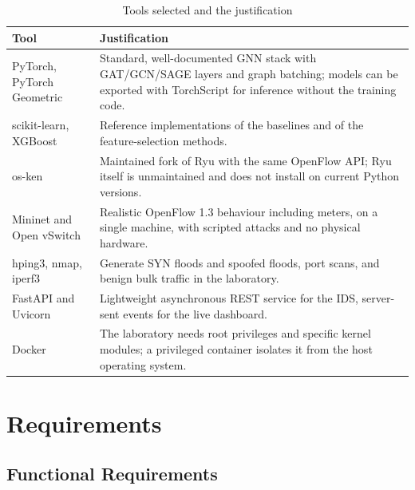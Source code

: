 \begin{table}[htbp]
\centering
\caption{Tools selected and the justification}
\label{tab:tools}
\small
\begin{tabularx}{\textwidth}{|p{3.2cm}|X|}
\hline
\textbf{Tool} & \textbf{Justification} \\ \hline
PyTorch, PyTorch Geometric & Standard, well-documented GNN stack with GAT/GCN/SAGE layers and graph batching; models can be exported with TorchScript for inference without the training code. \\ \hline
scikit-learn, XGBoost & Reference implementations of the baselines and of the feature-selection methods. \\ \hline
os-ken & Maintained fork of Ryu with the same OpenFlow API; Ryu itself is unmaintained and does not install on current Python versions. \\ \hline
Mininet and Open vSwitch & Realistic OpenFlow 1.3 behaviour including meters, on a single machine, with scripted attacks and no physical hardware. \\ \hline
hping3, nmap, iperf3 & Generate SYN floods and spoofed floods, port scans, and benign bulk traffic in the laboratory. \\ \hline
FastAPI and Uvicorn & Lightweight asynchronous REST service for the IDS, server-sent events for the live dashboard. \\ \hline
Docker & The laboratory needs root privileges and specific kernel modules; a privileged container isolates it from the host operating system. \\ \hline
\end{tabularx}
\end{table}

\section{Requirements}
\subsection{Functional Requirements}

